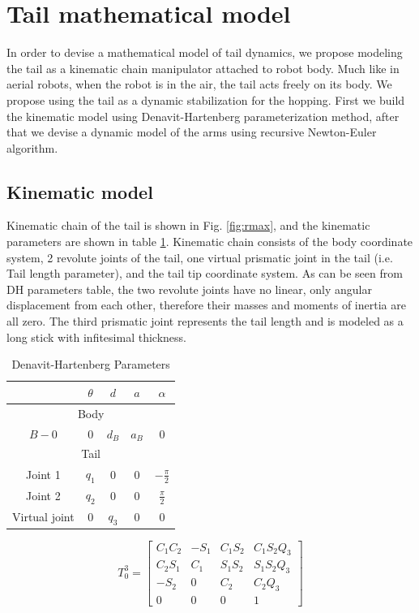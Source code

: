 \section{Tail mathematical model}
In order to devise a mathematical model of tail dynamics, we propose modeling the tail as a kinematic chain manipulator attached to robot body. Much like in aerial robots, when the robot is in the air, the tail acts freely on its body. We propose using the tail as a dynamic stabilization for the hopping. First we build the kinematic model using Denavit-Hartenberg parameterization method, after that we devise a dynamic model of the arms using recursive Newton-Euler algorithm.

\subsection{Kinematic model}
Kinematic chain of the tail is shown in Fig. \ref{fig:rmax}, and the kinematic parameters are shown in table \ref{tab:DHParameters}. Kinematic chain consists of the body coordinate system, 2 revolute joints  of the tail, one virtual prismatic joint in the tail (i.e. Tail length parameter), and the tail tip coordinate system. As can be seen from DH parameters table, the two revolute joints have no linear, only angular displacement from each other, therefore their masses and moments of inertia are all zero. The third prismatic joint represents the tail length and is modeled as a long stick with infitesimal thickness. 

\begin{table}
	\centering
		\begin{tabular}{ccccc}
		\hline
			& $\theta$ & $d$ & $a$ & $\alpha$ \\\hline
			\multicolumn{5}{c}{Body}\\\hline
			$B-0$ & $0$ & $d_B$ & $a_B$ & $0$\\\hline
			\multicolumn{5}{c}{Tail}\\\hline
			Joint 1 & $q_1$ & $0$ & $0$ & $-\frac{\pi}{2}$\\
			Joint 2 & $q_2$ & $0$ & $0$ & $\frac{\pi}{2}$\\
			Virtual joint& $0$ & $q_3$ & $0$ & $0$\\\hline
		\end{tabular}
	\caption{Denavit-Hartenberg Parameters}\label{tab:DHParameters}
\end{table}

\begin{equation}
T_0^3=\begin{bmatrix}
C_1 C_2 & -S_1 & C_1 S_2 & C_1 S_2 Q_3 \\
C_2 S_1 & C_1 & S_1 S_2 & S_1 S_2 Q_3 \\
-S_2 & 0 & C_2 & C_2 Q_3 \\
 0 & 0 & 0 & 1
\end{bmatrix}
\end{equation}

